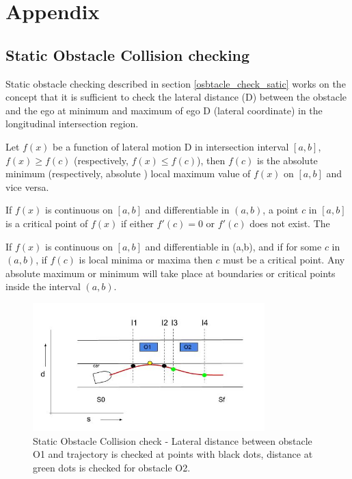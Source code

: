 \chapter{Appendix}

\section{Static Obstacle Collision checking}
\label{static_obst_appendix}
Static obstacle checking described in section \ref{osbtacle_check_satic} works on the concept that it is sufficient to check the lateral distance (D) between the obstacle and the ego at minimum and maximum of ego D (lateral coordinate) in the longitudinal intersection region.

Let $f(x)$ be a function of lateral motion D in intersection interval $[a,b]$, $f(x)\ge f(c)$ (respectively, $f(x)\le f(c)$), then $f(c)$ is the absolute minimum (respectively, absolute ) local maximum value of $f(x)$ on $[a,b]$ and vice versa. 

If $f(x)$ is continuous on $[a, b]$ and differentiable in $(a, b)$, a point $c$ in $[a, b]$ is a critical point of $f(x)$ if either $f'(c) =0$ or $f'(c)$ does not exist. The 

If $f(x)$ is continuous on $[a,b]$ and differentiable in (a,b), and if for some $c$ in $(a,b)$, if $f(c)$ is local minima or maxima then $c$ must be a critical point. Any absolute maximum or minimum will take place at boundaries or critical points inside the interval $(a,b)$. 


\begin{figure}
	\centering
	\includegraphics[width=0.8\textwidth]{Images/appendix/staticpoints.jpg}
	\caption{Static Obstacle Collision check - Lateral distance between obstacle O1 and trajectory is checked at points with black dots, distance at green dots is checked for obstacle O2.}
	\label{cstat_coll_appen}
\end{figure}

